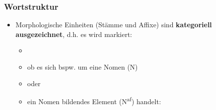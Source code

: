 \begin{frame}
\frametitle{Wortstruktur}

\begin{minipage}{0.48\textwidth}
\begin{itemize}
	\item Morphologische Einheiten (Stämme und Affixe) sind \textbf{kategoriell ausgezeichnet}, d.h. es wird markiert: 
	
	\begin{itemize}
		\item[]
		\item ob es sich bspw. um eine Nomen (N)
		\item[] oder
		\item ein Nomen bildendes Element (N\textsuperscript{af}) handelt:
	\end{itemize}
\end{itemize}
\end{minipage}\hfill%
\begin{minipage}{.48\textwidth}

\begin{figure}	
\centering
{}

\centering
{}
\end{figure}
\end{minipage}
\end{frame}


